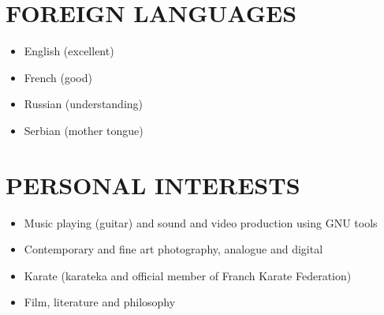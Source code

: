 \documentclass[a4paper, oneside, final]{scrartcl}
\begin{document}
\section{FOREIGN LANGUAGES}
\begin{itemize}
   \item English (excellent)
   \item French (good)
   \item Russian (understanding)
   \item Serbian (mother tongue)
\end{itemize}


\section{PERSONAL INTERESTS}
\begin{itemize}
   \item Music playing (guitar) and sound and video production using GNU
            tools
   \item Contemporary and fine art photography, analogue and digital 
   \item Karate (karateka and official member of Franch Karate Federation)
   \item Film, literature and philosophy
\end{itemize}
\end{document}
